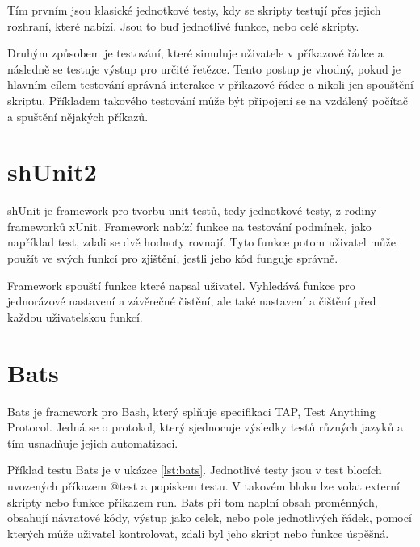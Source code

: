 \documentclass[thesis=M,czech]{FITthesis}[2012/06/26]
\begin{document}
Tím prvním jsou klasické jednotkové testy, kdy se skripty testují přes jejich rozhraní, které nabízí. Jsou to buď jednotlivé funkce, nebo celé skripty.

Druhým způsobem je testování, které simuluje uživatele v příkazové řádce a následně se testuje výstup pro určité řetězce. Tento postup je vhodný, pokud je hlavním cílem testování správná interakce v příkazové řádce a nikoli jen spouštění skriptu. Příkladem takového testování může být připojení se na vzdálený počítač a spuštění nějakých příkazů.



\section{shUnit2}

shUnit je framework pro tvorbu unit testů, tedy jednotkové testy, z rodiny frameworků xUnit. Framework nabízí funkce na testování podmínek, jako například test, zdali se dvě hodnoty rovnají. Tyto funkce potom uživatel může použít ve svých funkcí pro zjištění, jestli jeho kód funguje správně.

Framework spouští funkce které napsal uživatel. Vyhledává funkce pro jednorázové nastavení a závěrečné čistění, ale také nastavení a čištění před každou uživatelskou funkcí.



\section{Bats}
Bats je framework pro Bash, který splňuje specifikaci TAP, Test Anything Protocol. Jedná se o protokol, který sjednocuje výsledky testů různých jazyků a tím usnadňuje jejich automatizaci.

Příklad testu Bats je v ukázce \ref{lst:bats}. Jednotlivé testy jsou v test blocích uvozených příkazem @test a popiskem testu. V takovém bloku lze volat externí skripty nebo funkce příkazem run. Bats při tom naplní obsah proměnných, obsahují návratové kódy, výstup jako celek, nebo pole jednotlivých řádek, pomocí kterých může uživatel kontrolovat, zdali byl jeho skript nebo funkce úspěšná.
\end{document}
